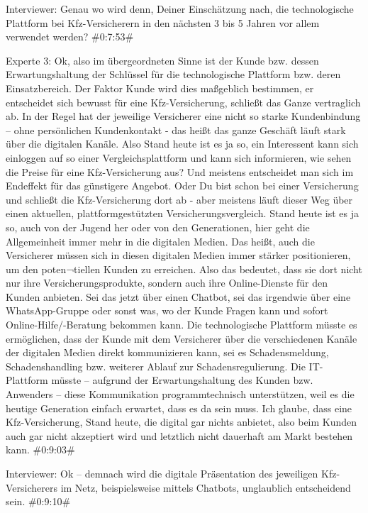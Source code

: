 Interviewer:
Genau wo wird denn, Deiner Einschätzung nach, die technologische Plattform bei Kfz-Versicherern in den nächsten 3 bis 5 Jahren vor allem verwendet werden?
\#0:7:53\#

Experte 3:
Ok, also im übergeordneten Sinne ist der Kunde bzw. dessen Erwartungshaltung der Schlüssel für die technologische Plattform bzw. deren Einsatzbereich. Der Faktor Kunde wird dies maßgeblich bestimmen, er entscheidet sich bewusst für eine Kfz-Versicherung, schließt das Ganze vertraglich ab. In der Regel hat der jeweilige Versicherer eine nicht so starke Kundenbindung – ohne persönlichen Kundenkontakt - das heißt das ganze Geschäft läuft stark über die digitalen Kanäle. Also Stand heute ist es ja so, ein Interessent kann sich einloggen auf so einer Vergleichsplattform und kann sich informieren, wie sehen die Preise für eine Kfz-Versicherung aus? Und meistens entscheidet man sich im Endeffekt für das günstigere Angebot. Oder Du bist schon bei einer Versicherung und schließt die Kfz-Versicherung dort ab - aber meistens läuft dieser Weg über einen aktuellen, plattformgestützten Versicherungsvergleich. Stand heute ist es ja so, auch von der Jugend her oder von den Generationen, hier geht die Allgemeinheit immer mehr in die digitalen Medien. Das heißt, auch die Versicherer müssen sich in diesen digitalen Medien immer stärker positionieren, um den poten¬tiellen Kunden zu erreichen. Also das bedeutet, dass sie dort nicht nur ihre Versicherungsprodukte, sondern auch ihre Online-Dienste für den Kunden anbieten. Sei das jetzt über einen Chatbot, sei das irgendwie über eine WhatsApp-Gruppe oder sonst was, wo der Kunde Fragen kann und sofort Online-Hilfe/-Beratung bekommen kann. Die technologische Plattform müsste es ermöglichen, dass der Kunde mit dem Versicherer über die verschiedenen Kanäle der digitalen Medien direkt kommunizieren kann, sei es Schadensmeldung, Schadenshandling bzw. weiterer Ablauf zur Schadensregulierung. Die IT-Plattform müsste – aufgrund der Erwartungshaltung des Kunden bzw. Anwenders – diese Kommunikation programmtechnisch unterstützen, weil es die heutige Generation einfach erwartet, dass es da sein muss. Ich glaube, dass eine Kfz-Versicherung, Stand heute, die digital gar nichts anbietet, also beim Kunden auch gar nicht akzeptiert wird und letztlich nicht dauerhaft am Markt bestehen kann.
\#0:9:03\#

Interviewer:
Ok – demnach wird die digitale Präsentation des jeweiligen Kfz-Versicherers im Netz, beispielsweise mittels Chatbots, unglaublich entscheidend sein.
\#0:9:10\#

